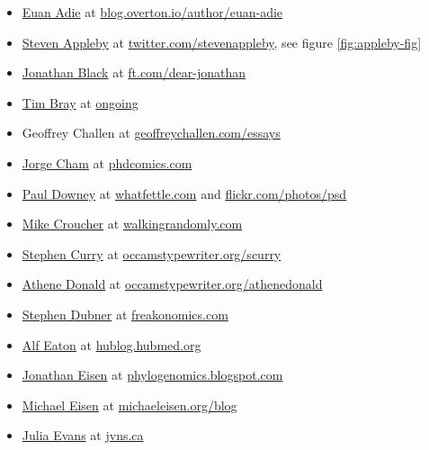 \documentclass[
]{book}
\providecommand{\tightlist}{%
  \setlength{\itemsep}{0pt}\setlength{\parskip}{0pt}}
\begin{document}
\begin{itemize}
\tightlist
\item
  \href{https://twitter.com/stew}{Euan Adie} at \href{https://blog.overton.io/author/euan-adie}{blog.overton.io/author/euan-adie}
\item
  \href{https://en.wikipedia.org/wiki/Steven_Appleby}{Steven Appleby} at \href{https://twitter.com/stevenappleby}{twitter.com/stevenappleby}, see figure \ref{fig:appleby-fig}
\item
  \href{https://www.new.ox.ac.uk/node/1003}{Jonathan Black} at \href{https://www.ft.com/dear-jonathan}{ft.com/dear-jonathan}
\item
  \href{https://en.wikipedia.org/wiki/Tim_Bray}{Tim Bray} at \href{https://www.tbray.org/ongoing/}{ongoing}
\item
  Geoffrey Challen at \href{https://www.geoffreychallen.com/essays}{geoffreychallen.com/essays}
\item
  \href{https://en.wikipedia.org/wiki/Jorge_Cham}{Jorge Cham} at \href{https://phdcomics.com/}{phdcomics.com}
\item
  \href{https://twitter.com/psd}{Paul Downey} at \href{https://blog.whatfettle.com/}{whatfettle.com} and \href{https://www.flickr.com/photos/psd/}{flickr.com/photos/psd}
\item
  \href{https://twitter.com/walkingrandomly}{Mike Croucher} at \href{https://walkingrandomly.com/}{walkingrandomly.com}
\item
  \href{https://twitter.com/Stephen_Curry}{Stephen Curry} at \href{https://occamstypewriter.org/scurry}{occamstypewriter.org/scurry}
\item
  \href{https://en.wikipedia.org/wiki/Athene_Donald}{Athene Donald} at \href{http://occamstypewriter.org/athenedonald}{occamstypewriter.org/athenedonald}
\item
  \href{https://en.wikipedia.org/wiki/Stephen_J._Dubner}{Stephen Dubner} at \href{https://freakonomics.com/}{freakonomics.com}
\item
  \href{https://twitter.com/invisiblecomma}{Alf Eaton} at \href{https://hublog.hubmed.org/}{hublog.hubmed.org}
\item
  \href{https://en.wikipedia.org/wiki/Jonathan_Eisen}{Jonathan Eisen} at \href{https://phylogenomics.blogspot.com/}{phylogenomics.blogspot.com}
\item
  \href{https://en.wikipedia.org/wiki/Michael_Eisen}{Michael Eisen} at \href{https://www.michaeleisen.org/blog/}{michaeleisen.org/blog}
\item
  \href{https://twitter.com/b0rk}{Julia Evans} at \href{https://jvns.ca/}{jvns.ca}

\end{itemize}
\end{document}
